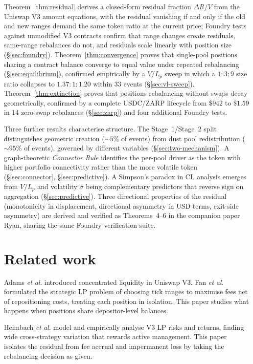 \documentclass[11pt,a4paper]{article}
\begin{document}
Theorem~\ref{thm:residual} derives a closed-form residual fraction $\Delta R/V$ from the Uniswap V3 amount equations, with the residual vanishing if and only if the old and new ranges demand the same token ratio at the current price; Foundry tests against unmodified V3 contracts confirm that range changes create residuals, same-range rebalances do not, and residuals scale linearly with position size (\S\ref{sec:foundry}). Theorem~\ref{thm:convergence} proves that single-pool positions sharing a contract balance converge to equal value under repeated rebalancing (\S\ref{sec:equilibrium}), confirmed empirically by a $V/L_p$ sweep in which a $1{:}3{:}9$ size ratio collapses to $1.37{:}1{:}1.20$ within 33 events (\S\ref{sec:vl-sweep}). Theorem~\ref{thm:extinction} proves that positions rebalancing without swaps decay geometrically, confirmed by a complete USDC/ZARP lifecycle from $\$942$ to $\$1.59$ in 14 zero-swap rebalances (\S\ref{sec:zarp}) and four additional Foundry tests.

Three further results characterise structure. The Stage~1/Stage~2 split distinguishes geometric creation (${\sim}5\%$ of events) from dust pool redistribution (${\sim}95\%$ of events), governed by different variables (\S\ref{sec:two-mechanism}). A graph-theoretic \emph{Connector Rule} identifies the per-pool driver as the token with higher portfolio connectivity rather than the more volatile token (\S\ref{sec:connector}, \S\ref{sec:predictive}). A Simpson's paradox in CL analysis emerges from $V/L_p$ and volatility $\sigma$ being complementary predictors that reverse sign on aggregation (\S\ref{sec:predictive}). Three directional properties of the residual (monotonicity in displacement, directional asymmetry in USD terms, exit-side asymmetry) are derived and verified as Theorems~4--6 in the companion paper Ryan\cite{ryan2026b}, sharing the same Foundry verification suite.

\section{Related work}\label{sec:related}

Adams \emph{et al.}\cite{adams2021} introduced concentrated liquidity in Uniswap V3. Fan \emph{et al.}\cite{fan2023} formulated the strategic LP problem of choosing tick ranges to maximise fees net of repositioning costs, treating each position in isolation. This paper studies what happens when positions share depositor-level balances.

Heimbach \emph{et al.}\cite{heimbach2022} model and empirically analyse V3 LP risks and returns, finding wide cross-strategy variation that rewards active management. This paper isolates the residual from fee accrual and impermanent loss by taking the rebalancing decision as given.
\end{document}
